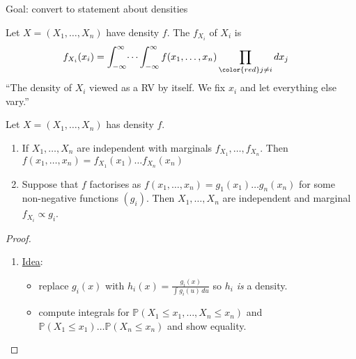 Goal: convert to statement about densities

\begin{definition}
    Let $X = (X_1, \dots, X_n)$ have density $f$.
    The  $f_{X_i}$ of $X_i$ is 
    \begin{align*}
        f_{X_i}(x_i) &= \int_{-\infty}^{\infty} \dots \int_{-\infty}^{\infty} f(x_1, \dots, x_n) \prod_{\color{red} j \neq i} dx_j
    \end{align*} 
    \color{blue} ``The density of $X_i$ viewed as a RV by itself. We fix $x_i$ and let everything else vary.''
\end{definition} 

\begin{theorem}
    Let $X = (X_1,\dots,X_n)$ has density $f$.
    \begin{enumerate}
        \item If $X_1,\dots,X_n$ are independent with marginals $f_{X_1},\dots, f_{X_n}$. Then $f(x_1, \dots, x_n) = f_{X_1}(x_1) \dots f_{X_n}(x_n)$
        \item Suppose that $f$ factorises as $f(x_1, \dots, x_n) = g_1(x_1) \dots g_n(x_n)$ for some non-negative functions $(g_i)$. Then $X_1,\dots, X_n$ are independent and marginal $f_{X_i} \propto g_i$.
    \end{enumerate}
\end{theorem}

\begin{proof} ~
    \begin{enumerate}
        \mathitem \begin{align*}
            \mathbb{P}(X_1\leq x_1,\dots, X_n\leq x_n) &= \mathbb{P}(X_1\leq x_1)\dots \mathbb{P}(X_n\leq x_n)\\
            &= \left[ \int_{-\infty}^{x_1} f_{X_1}(u_1) \,du_1 \right] \dots \left[ \int_{-\infty}^{x_n} f_{X_n}(u_n) \,du_n \right] \\
            &=\int_{-\infty}^{x_1} \dots \int_{-\infty}^{x_n} \underbracket{\prod f_{X_i}(u_i)}_{\color{red} \text{matches definition of } f} \prod du_i
        \end{align*}
        \item \underline{Idea}: \begin{itemize}
            \item replace $g_i(x)$ with $h_i(x) = \frac{g_i(x)}{\int g_i(u) \,du}$ so $h_i$ \emph{is} a density.
            \item compute integrals for $\mathbb{P}(X_1\leq x_1,\dots,X_n\leq x_n)$ and $\mathbb{P}(X_1\leq x_1)\dots \mathbb{P}(X_n\leq x_n)$ and show equality.
        \end{itemize} 
    \end{enumerate}
\end{proof}

